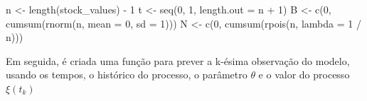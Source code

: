 \documentclass[
  letterpaper,
  DIV=11,
  numbers=noendperiod]{scrreprt}
\newenvironment{Shaded}{\begin{snugshade}}{\end{snugshade}}
\newcommand{\AttributeTok}[1]{\textcolor[rgb]{0.40,0.45,0.13}{#1}}
\newcommand{\DecValTok}[1]{\textcolor[rgb]{0.68,0.00,0.00}{#1}}
\newcommand{\FunctionTok}[1]{\textcolor[rgb]{0.28,0.35,0.67}{#1}}
\newcommand{\NormalTok}[1]{\textcolor[rgb]{0.00,0.23,0.31}{#1}}
\newcommand{\OtherTok}[1]{\textcolor[rgb]{0.00,0.23,0.31}{#1}}
\newcommand{\SpecialCharTok}[1]{\textcolor[rgb]{0.37,0.37,0.37}{#1}}
\begin{document}
\begin{Shaded}
\begin{Highlighting}[]
\NormalTok{n }\OtherTok{\textless{}{-}} \FunctionTok{length}\NormalTok{(stock\_values) }\SpecialCharTok{{-}} \DecValTok{1}
\NormalTok{t }\OtherTok{\textless{}{-}} \FunctionTok{seq}\NormalTok{(}\DecValTok{0}\NormalTok{, }\DecValTok{1}\NormalTok{, }\AttributeTok{length.out =}\NormalTok{ n }\SpecialCharTok{+} \DecValTok{1}\NormalTok{)}
\NormalTok{B }\OtherTok{\textless{}{-}} \FunctionTok{c}\NormalTok{(}\DecValTok{0}\NormalTok{, }\FunctionTok{cumsum}\NormalTok{(}\FunctionTok{rnorm}\NormalTok{(n, }\AttributeTok{mean =} \DecValTok{0}\NormalTok{, }\AttributeTok{sd =} \DecValTok{1}\NormalTok{)))}
\NormalTok{N }\OtherTok{\textless{}{-}} \FunctionTok{c}\NormalTok{(}\DecValTok{0}\NormalTok{, }\FunctionTok{cumsum}\NormalTok{(}\FunctionTok{rpois}\NormalTok{(n, }\AttributeTok{lambda =} \DecValTok{1} \SpecialCharTok{/}\NormalTok{ n)))}
\end{Highlighting}
\end{Shaded}

Em seguida, é criada uma função para prever a k-ésima observação do
modelo, usando os tempos, o histórico do processo, o parâmetro
\(\theta\) e o valor do processo \(\xi(t_{k})\)
\end{document}

